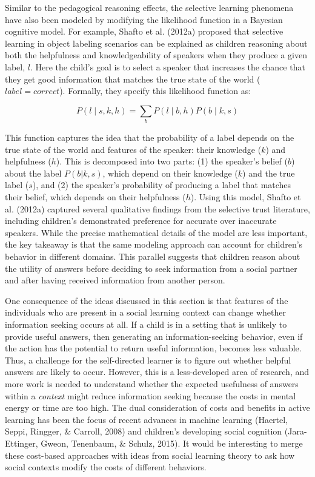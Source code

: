 \documentclass[oneside]{report}
\begin{document}
Similar to the pedagogical reasoning effects, the selective learning
phenomena have also been modeled by modifying the likelihood function in
a Bayesian cognitive model. For example, Shafto et al. (2012a) proposed
that selective learning in object labeling scenarios can be explained as
children reasoning about both the helpfulness and knowledgeability of
speakers when they produce a given label, \(l\). Here the child's goal
is to select a speaker that increases the chance that they get good
information that matches the true state of the world
(\(label=correct\)). Formally, they specify this likelihood function as:

\[P(l \mid s,k,h) = \sum_b P(l \mid b,h)P(b \mid k,s)\]

\noindent This function captures the idea that the probability of a
label depends on the true state of the world and features of the
speaker: their knowledge (\(k\)) and helpfulness (\(h\)). This is
decomposed into two parts: (1) the speaker's belief (\(b\)) about the
label \(P(b|k,s)\), which depend on their knowledge (\(k\)) and the true
label (\(s\)), and (2) the speaker's probability of producing a label
that matches their belief, which depends on their helpfulness (\(h\)).
Using this model, Shafto et al. (2012a) captured several qualitative
findings from the selective trust literature, including children's
demonstrated preference for accurate over inaccurate speakers. While the
precise mathematical details of the model are less important, the key
takeaway is that the same modeling approach can account for children's
behavior in different domains. This parallel suggests that children
reason about the utility of answers before deciding to seek information
from a social partner and after having received information from another
person.

One consequence of the ideas discussed in this section is that features
of the individuals who are present in a social learning context can
change whether information seeking occurs at all. If a child is in a
setting that is unlikely to provide useful answers, then generating an
information-seeking behavior, even if the action has the potential to
return useful information, becomes less valuable. Thus, a challenge for
the self-directed learner is to figure out whether helpful answers are
likely to occur. However, this is a less-developed area of research, and
more work is needed to understand whether the expected usefulness of
answers within a \emph{context} might reduce information seeking because
the costs in mental energy or time are too high. The dual consideration
of costs and benefits in active learning has been the focus of recent
advances in machine learning (Haertel, Seppi, Ringger, \& Carroll, 2008)
and children's developing social cognition (Jara-Ettinger, Gweon,
Tenenbaum, \& Schulz, 2015). It would be interesting to merge these
cost-based approaches with ideas from social learning theory to ask how
social contexts modify the costs of different behaviors.
\end{document}
